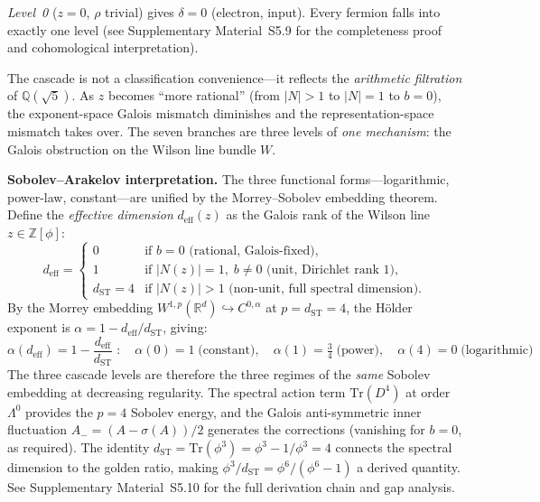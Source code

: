 \documentclass[12pt,a4paper]{article}
\theoremstyle{definition}
\begin{document}
\smallskip

\noindent\emph{Level~0} ($z = 0$, $\rho$ trivial) gives $\delta = 0$ (electron, input).  Every fermion falls into exactly one level (see Supplementary Material~S5.9 for the completeness proof and cohomological interpretation).

The cascade is not a classification convenience---it reflects the \emph{arithmetic filtration} of $\mathbb{Q}(\sqrt{5})$.  As $z$ becomes ``more rational'' (from $|N| > 1$ to $|N| = 1$ to $b = 0$), the exponent-space Galois mismatch diminishes and the representation-space mismatch takes over.  The seven branches are three levels of \emph{one mechanism}: the Galois obstruction on the Wilson line bundle $W$.

\textbf{Sobolev--Arakelov interpretation.}  The three functional forms---logarithmic, power-law, constant---are unified by the Morrey--Sobolev embedding theorem.  Define the \emph{effective dimension} $d_{\text{eff}}(z)$ as the Galois rank of the Wilson line $z \in \mathbb{Z}[\phi]$:
\begin{equation}
d_{\text{eff}} =
\begin{cases}
0 & \text{if } b = 0 \text{ (rational, Galois-fixed)}, \\
1 & \text{if } |N(z)| = 1,\; b \neq 0 \text{ (unit, Dirichlet rank 1)}, \\
d_{\text{ST}} = 4 & \text{if } |N(z)| > 1 \text{ (non-unit, full spectral dimension)}.
\end{cases}
\label{eq:d_eff}
\end{equation}
By the Morrey embedding $W^{1,p}(\mathbb{R}^d) \hookrightarrow C^{0,\alpha}$ at $p = d_{\text{ST}} = 4$, the H\"{o}lder exponent is $\alpha = 1 - d_{\text{eff}}/d_{\text{ST}}$, giving:
\begin{equation}
\boxed{\alpha(d_{\text{eff}}) = 1 - \frac{d_{\text{eff}}}{d_{\text{ST}}} \;:\quad
\alpha(0) = 1\;\text{(constant)},\quad
\alpha(1) = \tfrac{3}{4}\;\text{(power)},\quad
\alpha(4) = 0\;\text{(logarithmic)}}
\label{eq:morrey_alpha}
\end{equation}
The three cascade levels are therefore the three regimes of the \emph{same} Sobolev embedding at decreasing regularity.  The spectral action term $\mathrm{Tr}(D^4)$ at order~$\Lambda^0$ provides the $p = 4$ Sobolev energy, and the Galois anti-symmetric inner fluctuation $A_- = (A - \sigma(A))/2$ generates the corrections (vanishing for $b = 0$, as required).  The identity $d_{\text{ST}} = \mathrm{Tr}(\phi^3) = \phi^3 - 1/\phi^3 = 4$ connects the spectral dimension to the golden ratio, making $\phi^3/d_{\text{ST}} = \phi^6/(\phi^6 - 1)$ a derived quantity.  See Supplementary Material~S5.10 for the full derivation chain and gap analysis.
\end{document}
